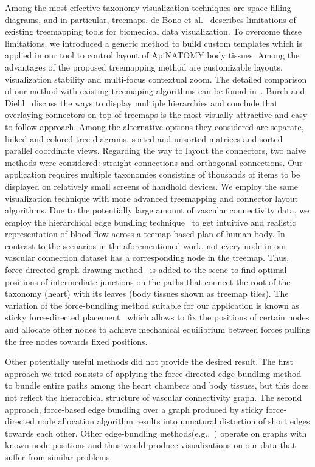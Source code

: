 Among the most effective taxonomy visualization techniques are space-filling diagrams, and in particular, treemaps.
de Bono et al.~\cite{BGS12} describes limitations of existing treemapping tools for biomedical data visualization. To overcome these limitations, we introduced a generic method to build custom templates which is applied in our tool to control layout of ApiNATOMY body tissues. Among the advantages of the proposed treemapping method are customizable layouts, visualization stability and multi-focus contextual zoom. The detailed comparison of our method with existing treemaping algorithms can be found in~\cite{KBK14}.
Burch and Diehl~\cite{BD06} discuss the ways to display multiple hierarchies and conclude that overlaying connectors on top of treemaps is the most visually attractive and easy to follow approach. Among the alternative options they considered are separate, linked and colored tree diagrams, sorted and unsorted matrices and sorted parallel coordinate views. Regarding the way to layout the connectors, two naive methods were considered: straight connections and orthogonal connections. %
Our application requires multiple taxonomies consisting of thousands of items to be displayed on relatively small screens of handhold devices. We employ the same visualization technique with more advanced treemapping and connector layout algorithms. Due to the potentially large amount of vascular connectivity data, we employ the hierarchical edge bundling technique~\cite{Hol06} to get intuitive and realistic representation of blood flow across a teemap-based plan of human body.
In contrast to the scenarios in the aforementioned work, not every node in our vascular connection dataset has a corresponding node in the treemap. Thus, force-directed graph drawing method~\cite{BET+99} is added to the scene to find optimal positions of intermediate junctions on the paths that connect the root of the taxonomy (heart) with its leaves (body tissues shown as treemap tiles). The variation of the force-bundling method suitable for our application is known as sticky force-directed placement~\cite{FR91} which allows to fix the positions of certain nodes and allocate other nodes to achieve mechanical equilibrium between forces pulling the free nodes towards fixed positions.

Other potentially useful methods did not provide the desired result. The first approach we tried consists of applying the
force-directed edge bundling method~\cite{HW09} to bundle entire paths among the heart chambers and body tissues, but this does not reflect the hierarchical structure of vascular connectivity graph. The second approach, force-based edge bundling over a graph produced by sticky force-directed node allocation algorithm results into unnatural distortion of short edges towards each other. Other edge-bundling methods(e.g.,~\cite{GHN+11,HET12,SHH11}) operate on graphs with known node positions and thus would produce visualizations on our data that suffer from similar problems.
